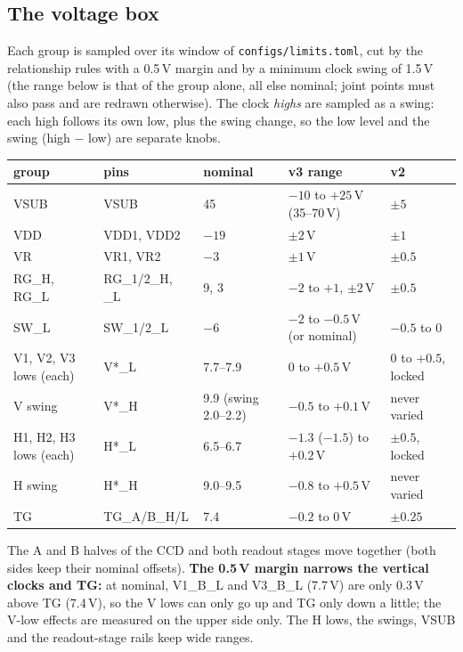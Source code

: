 \documentclass[11pt]{article}
\begin{document}
\subsection{The voltage box}
Each group is sampled over its window of \texttt{configs/limits.toml}, cut by the relationship rules with a 0.5\,V
margin and by a minimum clock swing of 1.5\,V (the range below is that of the group alone, all else nominal; joint points
must also pass and are redrawn otherwise). The clock \emph{highs} are sampled as a swing: each high follows its own low,
plus the swing change, so the low level and the swing (high $-$ low) are separate knobs.
\begin{center}
\begin{tabular}{lllll}
\toprule
group & pins & nominal & v3 range & v2\\
\midrule
VSUB & VSUB & 45 & $-10$ to $+25$\,V (35--70\,V) & $\pm 5$\\
VDD & VDD1, VDD2 & $-19$ & $\pm 2$\,V & $\pm 1$\\
VR & VR1, VR2 & $-3$ & $\pm 1$\,V & $\pm 0.5$\\
RG\_H, RG\_L & RG\_1/2\_H, \_L & 9, 3 & $-2$ to $+1$, $\pm 2$\,V & $\pm 0.5$\\
SW\_L & SW\_1/2\_L & $-6$ & $-2$ to $-0.5$\,V (or nominal) & $-0.5$ to 0\\
V1, V2, V3 lows (each) & V*\_L & 7.7--7.9 & 0 to $+0.5$\,V & 0 to $+0.5$, locked\\
V swing & V*\_H & 9.9 (swing 2.0--2.2) & $-0.5$ to $+0.1$\,V & never varied\\
H1, H2, H3 lows (each) & H*\_L & 6.5--6.7 & $-1.3$ ($-1.5$) to $+0.2$\,V & $\pm 0.5$, locked\\
H swing & H*\_H & 9.0--9.5 & $-0.8$ to $+0.5$\,V & never varied\\
TG & TG\_A/B\_H/L & 7.4 & $-0.2$ to 0\,V & $\pm 0.25$\\
\bottomrule
\end{tabular}
\end{center}
The A and B halves of the CCD and both readout stages move together (both sides keep their nominal offsets).
\textbf{The 0.5\,V margin narrows the vertical clocks and TG:} at nominal, V1\_B\_L and V3\_B\_L (7.7\,V) are only 0.3\,V
above TG (7.4\,V), so the V lows can only go up and TG only down a little; the V-low effects are measured on the upper
side only. The H lows, the swings, VSUB and the readout-stage rails keep wide ranges.
\end{document}
